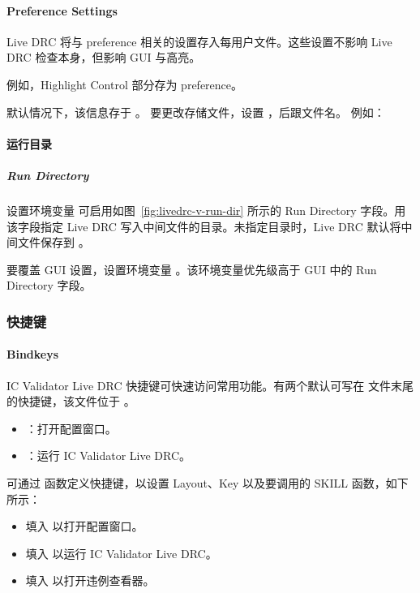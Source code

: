 \paragraph*{Preference Settings}

Live DRC 将与 preference 相关的设置存入每用户文件。这些设置不影响 Live DRC 检查本身，但影响 GUI 与高亮。

例如，Highlight Control 部分存为 preference。

默认情况下，该信息存于 。
要更改存储文件，设置 ，后跟文件名。
例如：

\paragraph{运行目录}
\subparagraph*{Run Directory}

设置环境变量  可启用如图~\ref{fig:livedrc-v-run-dir} 所示的 Run Directory 字段。用该字段指定 Live DRC 写入中间文件的目录。未指定目录时，Live DRC 默认将中间文件保存到 。


要覆盖 GUI 设置，设置环境变量 。该环境变量优先级高于 GUI 中的 Run Directory 字段。

\subsubsection{快捷键}
\paragraph*{Bindkeys}

IC Validator Live DRC 快捷键可快速访问常用功能。有两个默认可写在  文件末尾的快捷键，该文件位于 。

\begin{itemize}
  \item {}：打开配置窗口。
  \item {}：运行 IC Validator Live DRC。
\end{itemize}

可通过  函数定义快捷键，以设置 Layout、Key 以及要调用的 SKILL 函数，如下所示：
\begin{itemize}
  \item 填入  以打开配置窗口。
  \item 填入  以运行 IC Validator Live DRC。
  \item 填入  以打开违例查看器。
\end{itemize}

